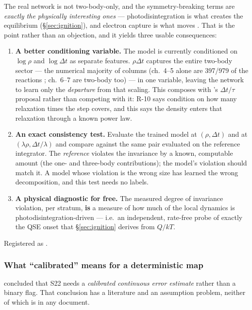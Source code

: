 The real network is not two-body-only, and the symmetry-breaking terms are
\emph{exactly the physically interesting ones} --- photodisintegration is what
creates the equilibrium (\S\ref{sec:ignition}), and electron capture is what
moves \Ye. That is the point rather than an objection, and it yields three
usable consequences:

\begin{enumerate}
\item \textbf{A better conditioning variable.} The model is currently
  conditioned on $\log\rho$ and $\log\Delta t$ as separate features.
  \textbf{$\rho\Delta t$} captures the entire two-body sector --- the numerical
  majority of columns (ch.~4--5 alone are 397/979 of the reactions
  ; ch.~6--7 are two-body too) --- in one variable,
  leaving the network to learn only the \emph{departure} from that scaling.
  This composes with 's $\Delta t/\tau$ proposal rather
  than competing with it: R-10 says condition on how many relaxation times the
  step covers, and this says the density enters that relaxation through a known
  power law.
\item \textbf{An exact consistency test.} Evaluate the trained model at
  $(\rho, \Delta t)$ and at $(\lambda\rho, \Delta t/\lambda)$ and compare
  against the same pair evaluated on the reference integrator. The
  \emph{reference} violates the invariance by a known, computable amount (the
  one- and three-body contributions); the model's violation should match it. A
  model whose violation is the wrong size has learned the wrong decomposition,
  and this test needs no labels.
\item \textbf{A physical diagnostic for free.} The measured degree of invariance
  violation, per stratum, \textbf{is} a measure of how much of the local
  dynamics is photodisintegration-driven --- i.e.\ an independent, rate-free
  probe of exactly the QSE onset that \S\ref{sec:ignition} derives from $Q/kT$.
\end{enumerate}

Registered as .

\subsubsection{What ``calibrated'' means for a deterministic map}
\label{sec:calibrated}

 concluded that S22 needs a \emph{calibrated continuous error
estimate} rather than a binary flag. That conclusion has a literature and an
assumption problem, neither of which is in any document.

